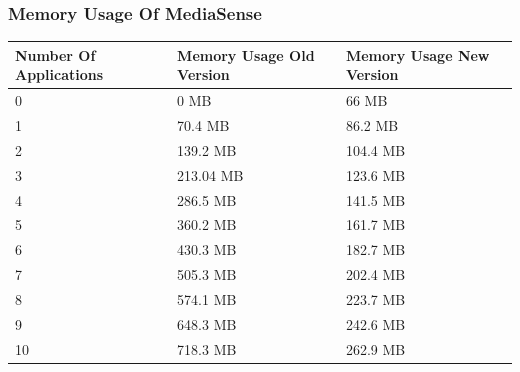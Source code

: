 \subsubsection{Memory Usage Of MediaSense}
\begin{center}
    \begin{tabular}[t!]{ | l | l | l |}
    \hline
    Number Of Applications								& Memory Usage Old Version				& Memory Usage New Version\\ \hline
    0 													& 0 MB									& 66 MB\\ \hline
    1 													& 70.4 MB								& 86.2 MB\\ \hline
    2 													& 139.2 MB								& 104.4 MB\\ \hline
    3 													& 213.04 MB								& 123.6 MB\\ \hline
    4 													& 286.5 MB								& 141.5 MB\\ \hline
    5 													& 360.2 MB								& 161.7 MB\\ \hline
    6 													& 430.3 MB								& 182.7 MB\\ \hline
    7 													& 505.3 MB								& 202.4 MB\\ \hline
    8 													& 574.1 MB								& 223.7 MB\\ \hline
    9 													& 648.3 MB								& 242.6 MB\\ \hline
    10 													& 718.3 MB								& 262.9 MB\\ \hline
    \end{tabular}
\end{center}
\clearpage
